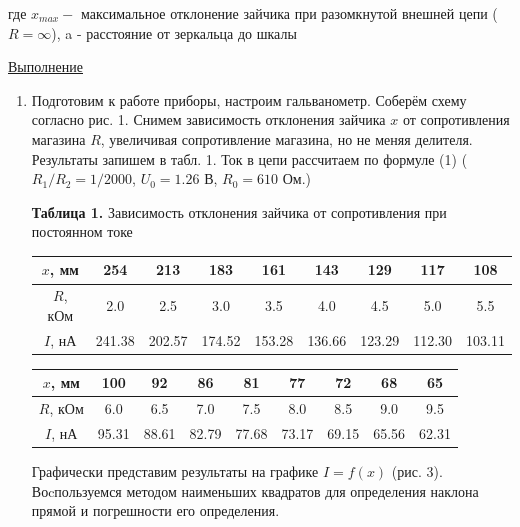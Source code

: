 \documentclass[a4paper]{article}
\begin{document}
где \(x_{max} - \) максимальное отклонение зайчика при разомкнутой внешней цепи (\(R = \infty\)), a - расстояние от зеркальца до шкалы

\begin{center}
    \raggedleft
        \underline{\underline{\LARGE {Выполнение}}}
\end{center}

\begin{enumerate}
    \item Подготовим к работе приборы, настроим гальванометр. Соберём схему согласно рис. 1. Снимем зависимость отклонения зайчика $x$ от сопротивления магазина $R$, увеличивая сопротивление магазина, но не меняя делителя. Результаты запишем в табл. 1. Ток в цепи рассчитаем по формуле (1) ($R_1/R_2 = 1/2000$, $U_0 = 1.26$ В, $R_0 = 610$ Ом.)
    
\begin{center}
    \textbf{Таблица 1.} Зависимость отклонения зайчика от сопротивления при постоянном токе

    \begin{tabular}{|c|c|c|c|c|c|c|c|c|}
        \hline
        $x$, мм & 254 & 213 & 183 & 161 & 143 & 129 & 117 & 108 \\
        \hline
        $R$, кОм & 2.0 & 2.5 & 3.0 & 3.5 & 4.0 & 4.5 & 5.0 & 5.5 \\
        \hline
        $I$, нА & 241.38 & 202.57 & 174.52 & 153.28 & 136.66 & 123.29 & 112.30 & 103.11 \\
        \hline
    \end{tabular}

    \begin{tabular}{|c|c|c|c|c|c|c|c|c|}
        \hline
        $x$, мм & 100 & 92 & 86 &81 & 77 & 72 & 68 & 65 \\
        \hline
        $R$, кОм & 6.0 & 6.5 & 7.0 & 7.5 & 8.0 & 8.5 & 9.0 & 9.5 \\
        \hline
        $I$, нА & 95.31 & 88.61 & 82.79 & 77.68 & 73.17 & 69.15 & 65.56 & 62.31 \\
        \hline
    \end{tabular}  
\end{center}

Графически представим результаты на графике $I = f(x)$ (рис. 3). Воcпользуемся методом наименьших квадратов для определения наклона прямой и погрешности его определения.  


\end{enumerate}
\end{document}
